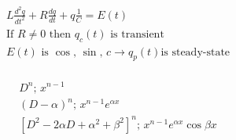 \documentclass[12pt]{article}
\begin{document}
\begin{multicols}{2}

  \begin{equation*}
    \begin{split}
      L\frac{d^2q}{dt^2}+R\frac{dq}{dt}+q\frac{1}{C}=E(t)\\
      \text{If }R\neq0\text{ then }q_c(t)\text{ is transient}\\
      E(t)\text{ is }\cos,\,\sin,\,c\rightarrow q_p(t)\text{is steady-state}\\
      \end{split}
    \label{1}
  \end{equation*}

  \begin{equation*}
    \begin{split}
      D^n;\,x^{n-1}\\
      (D-\alpha)^n;\,x^{n-1}e^{\alpha x}\\
      [D^2-2\alpha D+\alpha^2+\beta^2]^n;\,x^{n-1}e^{\alpha x}\cos\beta x
    \end{split}
    \label{2}
  \end{equation*}

\end{multicols}
\end{document}

